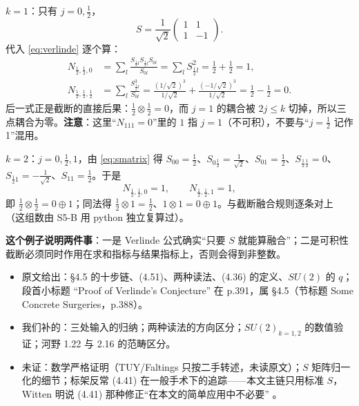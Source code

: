 \textbf{$k=1$}：只有 $j=0,\frac12$，
\begin{equation}
S=\frac{1}{\sqrt2}\begin{pmatrix}1&1\\1&-1\end{pmatrix}.
\end{equation}
代入 \eqref{eq:verlinde} 逐个算：
\begin{align}
N_{\frac12,\frac12,0}&=\sum_l\frac{S_{\frac12 l}S_{\frac12 l}S_{0l}}{S_{0l}}
=\sum_l S_{\frac12 l}^2=\frac12+\frac12=1,\\
N_{\frac12,\frac12,\frac12}&=\sum_l\frac{S_{\frac12 l}^3}{S_{0l}}
=\frac{(1/\sqrt2)^3}{1/\sqrt2}+\frac{(-1/\sqrt2)^3}{1/\sqrt2}
=\frac12-\frac12=0 .
\end{align}
后一式正是截断的直接后果：$\frac12\otimes\frac12=0$，而 $j=1$ 的耦合被 $2j\le k$ 切掉，所以三点耦合为零。\textbf{注意}：这里“$N_{111}=0$”里的 $1$ 指 $j=1$（不可积），不要与“$j=\frac12$ 记作 1”混用。

\textbf{$k=2$}：$j=0,\frac12,1$，由 \eqref{eq:smatrix} 得 $S_{00}=\frac12$、$S_{0\frac12}=\frac{1}{\sqrt2}$、$S_{01}=\frac12$、$S_{\frac12\frac12}=0$、$S_{\frac12 1}=-\frac{1}{\sqrt2}$、$S_{11}=\frac12$。于是
\begin{equation}
N_{\frac12,\frac12,0}=1,\qquad N_{\frac12,\frac12,1}=1,
\end{equation}
即 $\frac12\otimes\frac12=0\oplus1$；同法得 $\frac12\otimes1=\frac12$、$1\otimes1=0\oplus1$。与截断融合规则逐条对上 \ours（这组数由 S5-B 用 python 独立复算过）。

\textbf{这个例子说明两件事}：一是 Verlinde 公式确实“只要 $S$ 就能算融合”；二是可积性截断必须同时作用在求和指标与结果指标上，否则会得到非整数。


\begin{boundary}
\begin{itemize}[leftmargin=1.4em]
\item 原文给出：§4.5 的十步链、(4.51)、两种读法、(4.36) 的定义、$SU(2)$ 的 $q$；段首小标题 “Proof of Verlinde's Conjecture” 在 p.391，属 §4.5（节标题 Some Concrete Surgeries，p.388）。
\item 我们补的：三处输入的归纳；两种读法的方向区分；$SU(2)_{k=1,2}$ 的数值验证；河野 1.22 与 2.16 的范畴区分。
\item 未证：数学严格证明（TUY/Faltings 只按二手转述，未读原文）；$S$ 矩阵归一化的细节；标架反常 (4.41) 在一般手术下的追踪——本文主链只用标准 $S$，Witten 明说 (4.41) 那种修正“在本文的简单应用中不必要” 。
\end{itemize}
\end{boundary}
